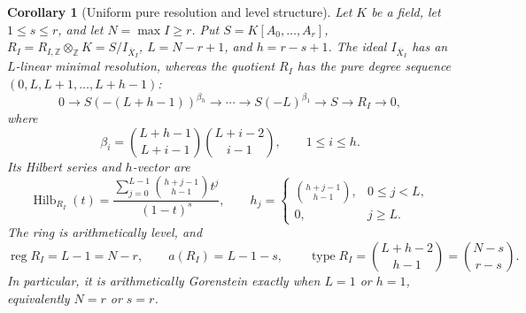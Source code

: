 \documentclass[10pt,fleqn]{article}
\numberwithin{equation}{section}
\newtheorem{corollary}[theorem]{Corollary}
\newcommand{\Hilb}{\operatorname{Hilb}}
\begin{document}
\begin{corollary}[Uniform pure resolution and level structure]
\label{cor:projective-resolution}
Let $K$ be a field, let $1\le s\le r$, and let $N=\max I\ge r$.
Put $S=K[A_0,\ldots,A_r]$,
$R_I=R_{I,\mathbb Z}\otimes_{\mathbb Z}K=S/I_{\overline X_I}$,
$L=N-r+1$, and $h=r-s+1$.  The ideal $I_{\overline X_I}$ has an
$L$-linear minimal resolution, whereas the quotient $R_I$ has the pure
degree sequence $(0,L,L+1,\ldots,L+h-1)$:
\begin{equation}\label{eq:projective-EN}
 0\longrightarrow S(-(L+h-1))^{\beta_h}\longrightarrow\cdots
 \longrightarrow S(-L)^{\beta_1}\longrightarrow S
 \longrightarrow R_I\longrightarrow0,
\end{equation}
where
\begin{equation}\label{eq:projective-Betti}
 \beta_i=\binom{L+h-1}{L+i-1}\binom{L+i-2}{i-1},
 \qquad 1\le i\le h.
\end{equation}
Its Hilbert series and $h$-vector are
\begin{equation}\label{eq:projective-Hilbert-vector}
 \Hilb_{R_I}(t)=
 \frac{\displaystyle\sum_{j=0}^{L-1}\binom{h+j-1}{h-1}t^j}{(1-t)^s},
 \qquad
 h_j=\begin{cases}
 \binom{h+j-1}{h-1},&0\le j<L,\\
 0,&j\ge L.
 \end{cases}
\end{equation}
The ring is arithmetically level, and
\begin{equation}\label{eq:projective-invariants}
 \operatorname{reg}R_I=L-1=N-r,\qquad
 a(R_I)=L-1-s,\qquad
 \operatorname{type}R_I=\binom{L+h-2}{h-1}=\binom{N-s}{r-s}.
\end{equation}
In particular, it is arithmetically Gorenstein exactly when
$L=1$ or $h=1$, equivalently $N=r$ or $s=r$.
\end{corollary}
\end{document}
